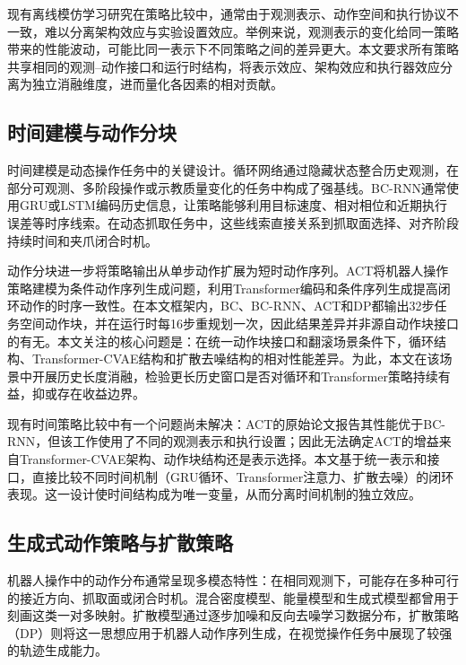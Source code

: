 现有离线模仿学习研究在策略比较中，通常由于观测表示、动作空间和执行协议不一致，难以分离架构效应与实验设置效应。举例来说，观测表示的变化给同一策略带来的性能波动，可能比同一表示下不同策略之间的差异更大。本文要求所有策略共享相同的观测--动作接口和运行时结构，将表示效应、架构效应和执行器效应分离为独立消融维度，进而量化各因素的相对贡献。

\subsection{时间建模与动作分块}

时间建模是动态操作任务中的关键设计。循环网络通过隐藏状态整合历史观测，在部分可观测、多阶段操作或示教质量变化的任务中构成了强基线\citep{mandlekar2021matters}。BC-RNN通常使用GRU或LSTM编码历史信息，让策略能够利用目标速度、相对相位和近期执行误差等时序线索。在动态抓取任务中，这些线索直接关系到抓取面选择、对齐阶段持续时间和夹爪闭合时机。

动作分块进一步将策略输出从单步动作扩展为短时动作序列。ACT将机器人操作策略建模为条件动作序列生成问题，利用Transformer编码和条件序列生成提高闭环动作的时序一致性\citep{zhao2023learning,vaswani2017attention}。在本文框架内，BC、BC-RNN、ACT和DP都输出32步任务空间动作块，并在运行时每16步重规划一次，因此结果差异并非源自动作块接口的有无。本文关注的核心问题是：在统一动作块接口和翻滚场景条件下，循环结构、Transformer-CVAE结构和扩散去噪结构的相对性能差异。为此，本文在该场景中开展历史长度消融，检验更长历史窗口是否对循环和Transformer策略持续有益，抑或存在收益边界。

现有时间策略比较中有一个问题尚未解决：ACT的原始论文报告其性能优于BC-RNN，但该工作使用了不同的观测表示和执行设置；因此无法确定ACT的增益来自Transformer-CVAE架构、动作块结构还是表示选择。本文基于统一表示和接口，直接比较不同时间机制（GRU循环、Transformer注意力、扩散去噪）的闭环表现。这一设计使时间结构成为唯一变量，从而分离时间机制的独立效应。

\subsection{生成式动作策略与扩散策略}

机器人操作中的动作分布通常呈现多模态特性：在相同观测下，可能存在多种可行的接近方向、抓取面或闭合时机。混合密度模型、能量模型和生成式模型都曾用于刻画这类一对多映射\citep{bishop1994mixture,florence2022implicit}。扩散模型通过逐步加噪和反向去噪学习数据分布\citep{ho2020denoising,song2021denoising}，扩散策略（DP）则将这一思想应用于机器人动作序列生成，在视觉操作任务中展现了较强的轨迹生成能力\citep{chi2023diffusion}。

